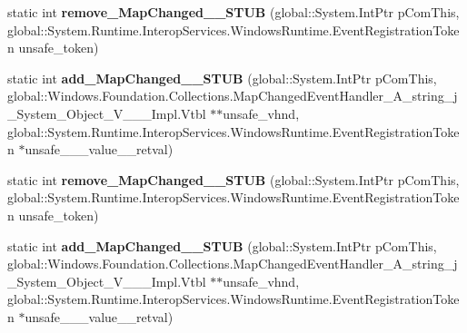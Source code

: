 \begin{DoxyCompactItemize}
\item 
\mbox{\label{struct_windows_1_1_foundation_1_1_collections_1_1_i_observable_map___a__string__j___system___object___v_______impl_1_1_vtbl_aeab9d91b53996d202ddf2ec84b918c08}} 
static int {\bfseries remove\+\_\+\+Map\+Changed\+\_\+\+\_\+\+S\+T\+UB} (global\+::\+System.\+Int\+Ptr p\+Com\+This, global\+::\+System.\+Runtime.\+Interop\+Services.\+Windows\+Runtime.\+Event\+Registration\+Token unsafe\+\_\+token)
\item 
\mbox{\label{struct_windows_1_1_foundation_1_1_collections_1_1_i_observable_map___a__string__j___system___object___v_______impl_1_1_vtbl_aac385382fcbf569438a34de44b202394}} 
static int {\bfseries add\+\_\+\+Map\+Changed\+\_\+\+\_\+\+S\+T\+UB} (global\+::\+System.\+Int\+Ptr p\+Com\+This, global\+::\+Windows.\+Foundation.\+Collections.\+Map\+Changed\+Event\+Handler\+\_\+\+A\+\_\+string\+\_\+j\+\_\+\+System\+\_\+\+Object\+\_\+\+V\+\_\+\+\_\+\+\_\+\+Impl.\+Vtbl $\ast$$\ast$unsafe\+\_\+vhnd, global\+::\+System.\+Runtime.\+Interop\+Services.\+Windows\+Runtime.\+Event\+Registration\+Token $\ast$unsafe\+\_\+\+\_\+\+\_\+value\+\_\+\+\_\+retval)
\item 
\mbox{\label{struct_windows_1_1_foundation_1_1_collections_1_1_i_observable_map___a__string__j___system___object___v_______impl_1_1_vtbl_aeab9d91b53996d202ddf2ec84b918c08}} 
static int {\bfseries remove\+\_\+\+Map\+Changed\+\_\+\+\_\+\+S\+T\+UB} (global\+::\+System.\+Int\+Ptr p\+Com\+This, global\+::\+System.\+Runtime.\+Interop\+Services.\+Windows\+Runtime.\+Event\+Registration\+Token unsafe\+\_\+token)
\item 
\mbox{\label{struct_windows_1_1_foundation_1_1_collections_1_1_i_observable_map___a__string__j___system___object___v_______impl_1_1_vtbl_aac385382fcbf569438a34de44b202394}} 
static int {\bfseries add\+\_\+\+Map\+Changed\+\_\+\+\_\+\+S\+T\+UB} (global\+::\+System.\+Int\+Ptr p\+Com\+This, global\+::\+Windows.\+Foundation.\+Collections.\+Map\+Changed\+Event\+Handler\+\_\+\+A\+\_\+string\+\_\+j\+\_\+\+System\+\_\+\+Object\+\_\+\+V\+\_\+\+\_\+\+\_\+\+Impl.\+Vtbl $\ast$$\ast$unsafe\+\_\+vhnd, global\+::\+System.\+Runtime.\+Interop\+Services.\+Windows\+Runtime.\+Event\+Registration\+Token $\ast$unsafe\+\_\+\+\_\+\+\_\+value\+\_\+\+\_\+retval)

\end{DoxyCompactItemize}
